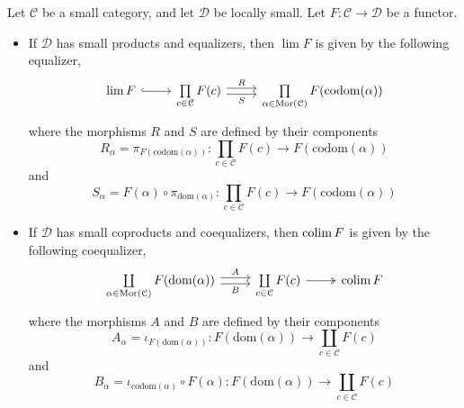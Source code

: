 \documentclass[main.tex]{subfiles}
\begin{document}
\begin{fact}
  \label{fact:limit_colimit_formula}
  Let $\mathcal{C}$ be a small category, and let $\mathcal{D}$ be locally small. Let $F\colon \mathcal{C} \to \mathcal{D}$ be a functor.
  \begin{itemize}
    \item If $\mathcal{D}$ has small products and equalizers, then $\lim F$ is given by the following equalizer,
      \begin{equation*}
        \begin{tikzcd}
          \lim F
          \arrow[r, hookrightarrow]
          & \prod\limits_{c \in \mathcal{C}} F(c)
          \arrow[r, shift left, "R"]
          \arrow[r, shift right, swap, "S"]
          & \prod\limits_{\alpha \in \mathrm{Mor}(\mathcal{C})} F(\mathrm{codom}(\alpha))
        \end{tikzcd}
      \end{equation*}
      where the morphisms $R$ and $S$ are defined by their components
      \begin{equation*}
        R_{\alpha} = \pi_{F(\mathrm{codom}(\alpha))}\colon \prod\limits_{c \in \mathcal{C}} F(c) \to F(\mathrm{codom}(\alpha))
      \end{equation*}
      and
      \begin{equation*}
        S_{\alpha} = F(\alpha) \circ \pi_{\mathrm{dom}(\alpha)}\colon \prod\limits_{c \in \mathcal{C}} F(c) \to F(\mathrm{codom}(\alpha))
      \end{equation*}

    \item If $\mathcal{D}$ has small coproducts and coequalizers, then $\operatorname*{colim} F$ is given by the following coequalizer,
      \begin{equation*}
        \begin{tikzcd}
          \coprod\limits_{\alpha \in \mathrm{Mor}(\mathcal{C})} F(\mathrm{dom}(\alpha))
          \arrow[r, shift left, "A"]
          \arrow[r, swap, shift right, "B"]
          & \coprod\limits_{c \in \mathcal{C}} F(c)
          \arrow[r, twoheadrightarrow]
          & \colim F
        \end{tikzcd}
      \end{equation*}
      where the morphisms $A$ and $B$ are defined by their components
      \begin{equation*}
        A_{\alpha} = \iota_{F(\mathrm{dom}(\alpha))}\colon F(\mathrm{dom}(\alpha)) \to \coprod_{c \in \mathcal{C}} F(c)
      \end{equation*}
      and
      \begin{equation*}
        B_{\alpha} = \iota_{\mathrm{codom}(\alpha)} \circ F(\alpha) \colon F(\mathrm{dom}(\alpha)) \to \coprod_{c \in \mathcal{C}} F(c)
      \end{equation*}
  \end{itemize}
\end{fact}
\end{document}
